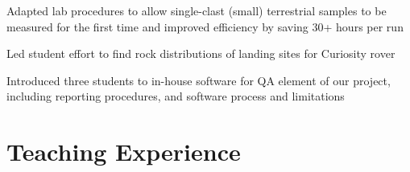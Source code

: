 \documentclass[letterpaper]{deedy-resume} %
\begin{document}
\begin{minipage}[t]{0.66\textwidth}



\begin{tightitemize}
\item Adapted lab procedures to allow single-clast (small) terrestrial samples to be measured for the first time and improved efficiency by saving 30+ hours per run \\
\end{tightitemize}

\sectionspace %



\begin{tightitemize}
\item Led student effort to find rock distributions of landing sites for Curiosity rover \\
\item Introduced three students to in-house software for QA element of our project, including reporting procedures, and software process and limitations \\
\end{tightitemize}



\section{Teaching Experience}


\end{minipage}
\end{document}
